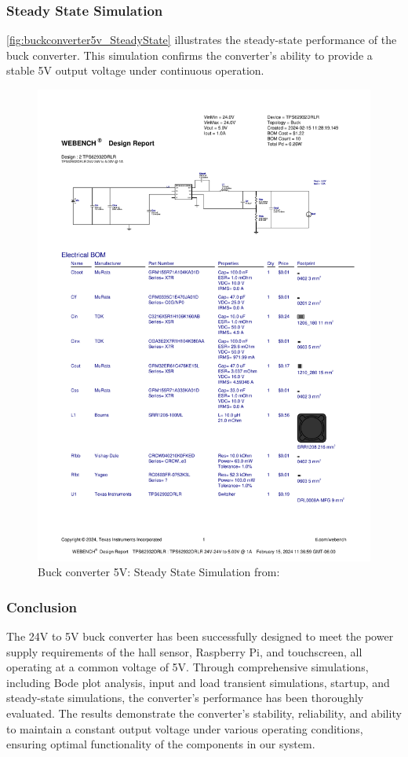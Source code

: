 \subsubsection{Steady State Simulation}
\autoref{fig:buckconverter5v_SteadyState} illustrates the steady-state performance of the buck converter. This simulation confirms the converter's ability to provide a stable 5V output voltage under continuous operation.
\begin{figure}[H]
    \centering
    \includegraphics[trim=0 200 0 70,clip,width=0.8\linewidth,page=8]{img//buckconverters//5v/WBDesign2_Steady State.pdf}
    \caption{Buck converter 5V: Steady State Simulation from: %
    }
    \label{fig:buckconverter5v_SteadyState}
\end{figure}

\subsubsection{Conclusion}
The 24V to 5V buck converter has been successfully designed to meet the power supply requirements of the hall sensor, Raspberry Pi, and touchscreen, all operating at a common voltage of 5V. Through comprehensive simulations, including Bode plot analysis, input and load transient simulations, startup, and steady-state simulations, the converter's performance has been thoroughly evaluated. The results demonstrate the converter's stability, reliability, and ability to maintain a constant output voltage under various operating conditions, ensuring optimal functionality of the components in our system.


